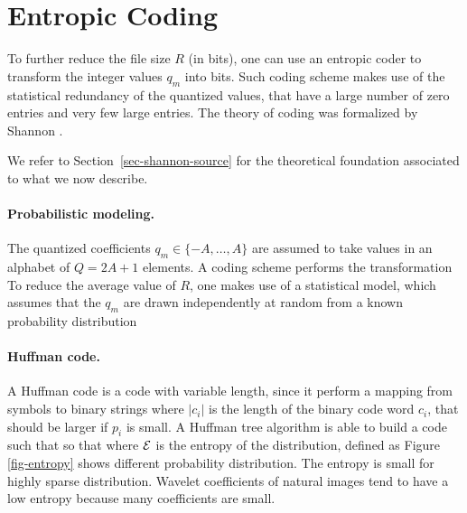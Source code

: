 


\section{Entropic Coding}
\label{subsec-entropic-coding}

To further reduce the file size $R$ (in bits), one can use an entropic coder to transform the integer values $q_m$ into bits. 
Such coding scheme makes use of the statistical redundancy of the quantized values, that have a large number of zero entries and very few large entries. The theory of coding was formalized by Shannon \cite{shannon-information}.

We refer to Section~\ref{sec-shannon-source} for the theoretical foundation associated to what we now describe. 


\paragraph{Probabilistic modeling.}

The quantized coefficients $q_m \in \{-A,\ldots,A\}$ are assumed to take values in an alphabet of $Q=2A+1$ elements.
A coding scheme performs the transformation 
To reduce the average value of $R$, one makes use of a statistical model, which assumes that the $q_m$ are drawn independently at random from a known probability distribution

\paragraph{Huffman code.}

A Huffman code is a code with variable length, since it perform a mapping from symbols to binary strings
where $|c_i|$ is the length of the binary code word $c_i$, that should be larger if $p_i$ is small. 
A Huffman tree algorithm is able to build a code such that 
so that 
where $\mathcal{E}$ is the entropy of the distribution, defined as
Figure \ref{fig-entropy} shows different probability distribution. The entropy is small for highly sparse distribution. Wavelet coefficients of natural images tend to have a low entropy because many coefficients are small.


